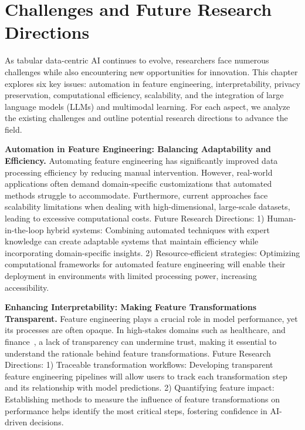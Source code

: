 \section{Challenges and Future Research Directions}

As tabular data-centric AI continues to evolve, researchers face numerous challenges while also encountering new opportunities for innovation. This chapter explores six key issues: automation in feature engineering, interpretability, privacy preservation, computational efficiency, scalability, and the integration of large language models (LLMs) and multimodal learning. For each aspect, we analyze the existing challenges and outline potential research directions to advance the field.

\noindent\textbf{Automation in Feature Engineering: Balancing Adaptability and Efficiency.}
Automating feature engineering has significantly improved data processing efficiency by reducing manual intervention. However, real-world applications often demand domain-specific customizations that automated methods struggle to accommodate. Furthermore, current approaches face scalability limitations when dealing with high-dimensional, large-scale datasets, leading to excessive computational costs. Future Research Directions:
1) Human-in-the-loop hybrid systems: Combining automated techniques with expert knowledge can create adaptable systems that maintain efficiency while incorporating domain-specific insights.
2) Resource-efficient strategies: Optimizing computational frameworks for automated feature engineering will enable their deployment in environments with limited processing power, increasing accessibility.

\noindent\textbf{Enhancing Interpretability: Making Feature Transformations Transparent.}
Feature engineering plays a crucial role in model performance, yet its processes are often opaque. In high-stakes domains such as healthcare, and finance~\cite{liu2025calorie,leng2023nlrp3}, a lack of transparency can undermine trust, making it essential to understand the rationale behind feature transformations. Future Research Directions:
1) Traceable transformation workflows: Developing transparent feature engineering pipelines will allow users to track each transformation step and its relationship with model predictions.
2) Quantifying feature impact: Establishing methods to measure the influence of feature transformations on performance helps identify the most critical steps, fostering confidence in AI-driven decisions.

